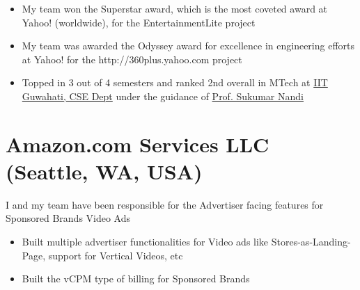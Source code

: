 \documentclass[11pt,a4paper,sans]{moderncv} %
\newcommand\Colorhref[3][blue]{\href{#2}{\small\color{#1}#3}}
\begin{document}
\begin{itemize}
\item My team won the Superstar award, which is the most coveted award at Yahoo! (worldwide), for the EntertainmentLite project
\item My team was awarded the Odyssey award for excellence in engineering efforts at Yahoo! for the http://360plus.yahoo.com project
\item Topped in 3 out of 4 semesters and ranked 2nd overall in MTech at \Colorhref{https://www.iitg.ac.in/cse/}{IIT Guwahati, CSE Dept} under the guidance of \Colorhref{https://www.iitg.ac.in/sukumar/consultancy.html}{Prof. Sukumar Nandi}
\end{itemize}

\section{Amazon.com Services LLC (Seattle, WA, USA)}
         {I and my team have been responsible for the Advertiser facing features for Sponsored Brands Video Ads
           \begin{itemize}
           \item Built multiple advertiser functionalities for Video ads like Stores-as-Landing-Page, support for Vertical Videos, etc
           \item Built the vCPM type of billing for Sponsored Brands
         \end{itemize}}
\end{document}
